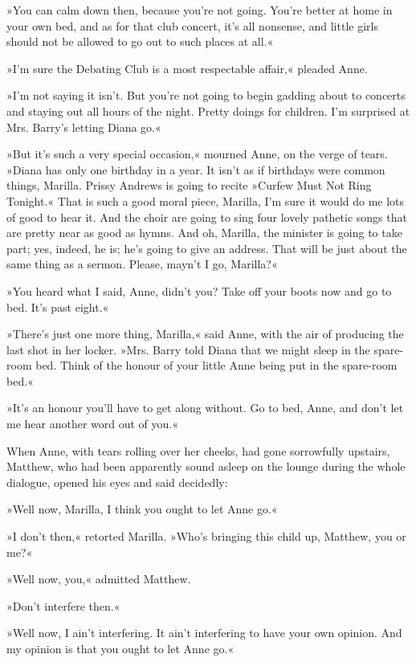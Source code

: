 »You can calm down then, because you're not going. You're better at home in your own bed, and as for that club concert, it's all nonsense, and little girls should not be allowed to go out to such places at all.«

»I'm sure the Debating Club is a most respectable affair,« pleaded Anne.

»I'm not saying it isn't. But you're not going to begin gadding about to concerts and staying out all hours of the night. Pretty doings for children. I'm surprised at Mrs. Barry's letting Diana go.«

»But it's such a very special occasion,« mourned Anne, on the verge of tears. »Diana has only one birthday in a year. It isn't as if birthdays were common things, Marilla. Prissy Andrews is going to recite »Curfew Must Not Ring Tonight.« That is such a good moral piece, Marilla, I'm sure it would do me lots of good to hear it. And the choir are going to sing four lovely pathetic songs that are pretty near as good as hymns. And oh, Marilla, the minister is going to take part; yes, indeed, he is; he's going to give an address. That will be just about the same thing as a sermon. Please, mayn't I go, Marilla?«

»You heard what I said, Anne, didn't you? Take off your boots now and go to bed. It's past eight.«

»There's just one more thing, Marilla,« said Anne, with the air of producing the last shot in her locker. »Mrs. Barry told Diana that we might sleep in the spare-room bed. Think of the honour of your little Anne being put in the spare-room bed.«

»It's an honour you'll have to get along without. Go to bed, Anne, and don't let me hear another word out of you.«

When Anne, with tears rolling over her cheeks, had gone sorrowfully upstairs, Matthew, who had been apparently sound asleep on the lounge during the whole dialogue, opened his eyes and said decidedly:

»Well now, Marilla, I think you ought to let Anne go.«

»I don't then,« retorted Marilla. »Who's bringing this child up, Matthew, you or me?«

»Well now, you,« admitted Matthew.

»Don't interfere then.«

»Well now, I ain't interfering. It ain't interfering to have your own opinion. And my opinion is that you ought to let Anne go.«

